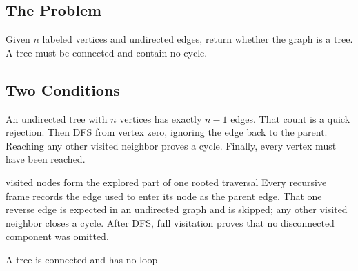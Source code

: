 
\subsection{The Problem}
Given \(n\) labeled vertices and undirected edges, return whether the graph is
a tree. A tree must be connected and contain no cycle.

\subsection{Two Conditions}
An undirected tree with \(n\) vertices has exactly \(n-1\) edges. That count is
a quick rejection. Then DFS from vertex zero, ignoring the edge back to the
parent. Reaching any other visited neighbor proves a cycle. Finally, every
vertex must have been reached.

\begin{invariantbox}{visited nodes form the explored part of one rooted traversal}
Every recursive frame records the edge used to enter its node as the parent
edge. That one reverse edge is expected in an undirected graph and is skipped;
any other visited neighbor closes a cycle. After DFS, full visitation proves
that no disconnected component was omitted.
\end{invariantbox}

\begin{visualbox}{A tree is connected and has no loop}
\centering
{}
\end{visualbox}

